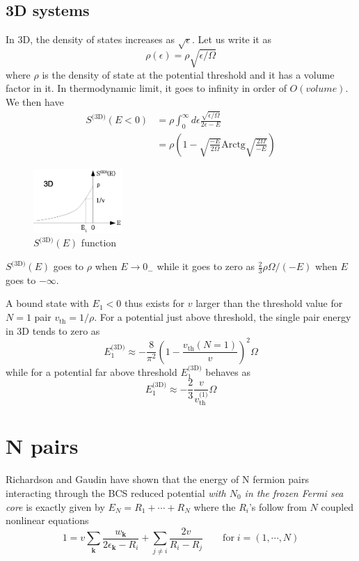 \documentclass{article}
\newcommand{\vk}{\ensuremath{\mathbf{k}}}
\newcommand{\sd}{{\ensuremath{{\text{(3D)}}}}}
\newcommand{\Arctg}{\ensuremath{\text{Arctg}}}
\begin{document}
\subsection{3D systems}
In 3D, the density of states increases as $\sqrt{\epsilon}$. Let us write it as 
\begin{equation}
\rho(\epsilon)=\rho\sqrt{\epsilon/\Omega}
\label{eq:}
\end{equation}
where $\rho$ is the density of state at the potential threshold and it has a volume factor in it. In thermodynamic limit, it goes to infinity in order of $O(volume)$.  We then have
\begin{equation}
\begin{split}
S^\sd(E<0)&=\rho\int_0^\infty{}d\epsilon\frac{\sqrt{\epsilon/\Omega}}{2\epsilon-E}\\
	&=\rho(1-\sqrt{\frac{-E}{2\Omega}}\Arctg\sqrt{\frac{2\Omega}{-E}})
\label{eq:}
\end{split}
\end{equation}
\begin{figure}[htbp]
	\centering
		\includegraphics[width=0.30\textwidth]{3dOnePair.eps}
	\caption{$S^\sd(E)$ function}
	\label{fig:3dOnePair}
\end{figure}

$S^\sd(E)$ goes to $\rho$ when $E\rightarrow0_-$ while it goes to zero as $\frac{2}{3}\rho\Omega/(-E)$ when $E$ goes to $-\infty$. 

A bound state with $E_1<0$ thus exists for $v$ larger than the threshold value for $N=1$ pair $v_{\text{th}}=1/\rho$.  For a potential just above threshold, the single pair energy in 3D tends to zero as 
\begin{equation}
E_1^\sd\approx-\frac{8}{\pi^2}\left(1-\frac{v_{\text{th}}(N=1)}{v}\right)^2\Omega
\label{eq:}
\end{equation}
while for a potential far above threshold $E_1^\sd$ behaves as 
\begin{equation}
E_1^\sd\approx-\frac{2}{3}\frac{v}{v_\text{th}^{\text{(1)}}}\Omega
\label{eq:}
\end{equation}


\section{N pairs\label{sec:NPair}}
Richardson \cite{Richardson1} and Gaudin \cite{gaudin} have shown that the energy of N fermion pairs interacting through the BCS reduced potential \emph{with $N_0$ in the frozen Fermi sea core} is exactly given by $E_N=R_1+\cdots+R_N$ where the $R_i$'s follow from $N$ coupled nonlinear equations 
\begin{equation}
 1=v\sum_\vk\frac{w_\vk}{2\epsilon_\vk-R_i}+\sum_{j\neq{}i}\frac{2v}{R_i-R_j}\qquad\text{for}\;i=(1,\cdots,N)
\end{equation}
\end{document}
